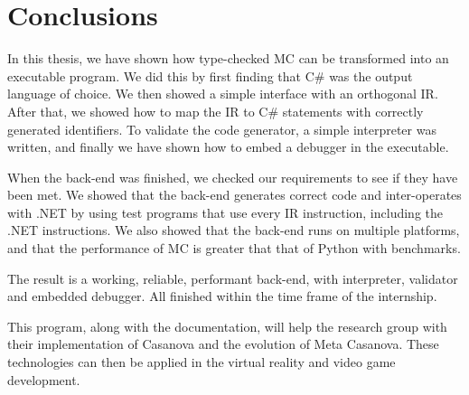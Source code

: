 \section{Conclusions}\label{conclusions}
In this thesis, we have shown how type-checked MC can be transformed into an executable program.
We did this by first finding that C\# was the output language of choice.
We then showed a simple interface with an orthogonal IR.
After that, we showed how to map the IR to C\# statements with correctly generated identifiers.
To validate the code generator, a simple interpreter was written, and finally we have shown how to embed a debugger in the executable.

When the back-end was finished, we checked our requirements to see if they have been met.
We showed that the back-end generates correct code and inter-operates with .NET by using test programs that use every IR instruction, including the .NET instructions.
We also showed that the back-end runs on multiple platforms, and that the performance of MC is greater that that of Python with benchmarks.

The result is a working, reliable, performant back-end, with interpreter, validator and embedded debugger.
All finished within the time frame of the internship.

This program, along with the documentation, will help the research group with their implementation of Casanova and the evolution of Meta Casanova.
These technologies can then be applied in the virtual reality and video game development.
